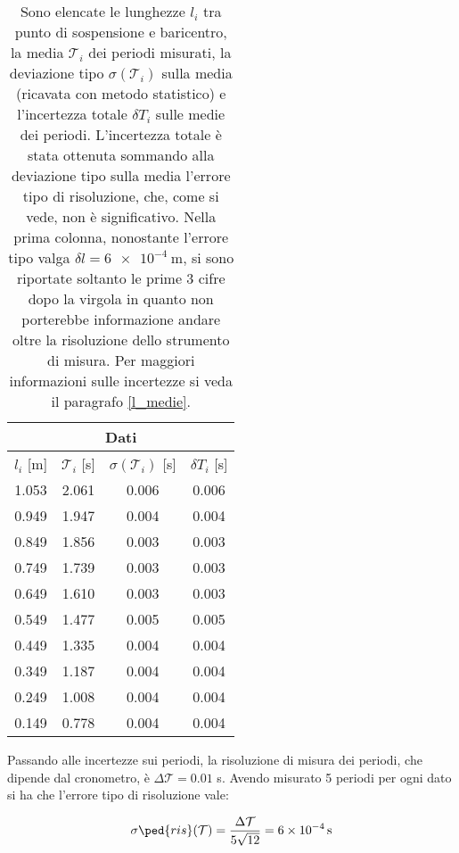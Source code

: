 \begin{SCtable}[1.4][b]
    \centering
    \begin{tabular}{c c c c}
        \multicolumn{4}{c}{\textbf{Dati}} \\
        \toprule
        $l_i$ [m] & $\mathcal{T}_i$ [s] & $\sigma(\mathcal{T}_i)$ [s] & $\delta T_i$ [s] \\
        \midrule
        1.053 & 2.061 & 0.006 & 0.006 \\
        0.949 & 1.947 & 0.004 & 0.004 \\
        0.849 & 1.856 & 0.003 & 0.003 \\
        0.749 & 1.739 & 0.003 & 0.003 \\
        0.649 & 1.610 & 0.003 & 0.003 \\
        0.549 & 1.477 & 0.005 & 0.005 \\
        0.449 & 1.335 & 0.004 & 0.004 \\
        0.349 & 1.187 & 0.004 & 0.004 \\
        0.249 & 1.008 & 0.004 & 0.004 \\
        0.149 & 0.778 & 0.004 & 0.004 \\
        \bottomrule
    \end{tabular}
    \caption{Sono elencate le lunghezze $l_i$ tra punto di sospensione e baricentro,
        la media $\mathcal{T}_i$ dei periodi misurati, la deviazione tipo $\sigma(\mathcal{T}_i)$
        sulla media (ricavata con metodo statistico) e l'incertezza totale $\delta T_i$
        sulle medie dei periodi. L'incertezza totale è stata ottenuta sommando alla deviazione tipo sulla media
        l'errore tipo di risoluzione, che, come si vede, non è significativo.
        Nella prima colonna, nonostante l'errore tipo valga $\delta l = \SI{6e-4}{\metre}$, si sono riportate
        soltanto le prime 3 cifre dopo la virgola in quanto non porterebbe informazione andare oltre la risoluzione
        dello strumento di misura. Per maggiori informazioni sulle
        incertezze si veda il paragrafo \ref{l_medie}.}
    \label{tab:l_dati}
\end{SCtable}

Passando alle incertezze sui periodi, la risoluzione di misura dei periodi, che dipende dal cronometro, è
$\Delta \mathcal{T} = 0.01$ s. Avendo misurato 5 periodi per ogni dato si ha che l'errore tipo di risoluzione vale:

\begin{equation}
	\sigma\ped{ris}(\mathcal{T}) = \frac{\Delta \mathcal{T}}{5\sqrt{12}} = \SI{6e-4}{s}
\end{equation}

